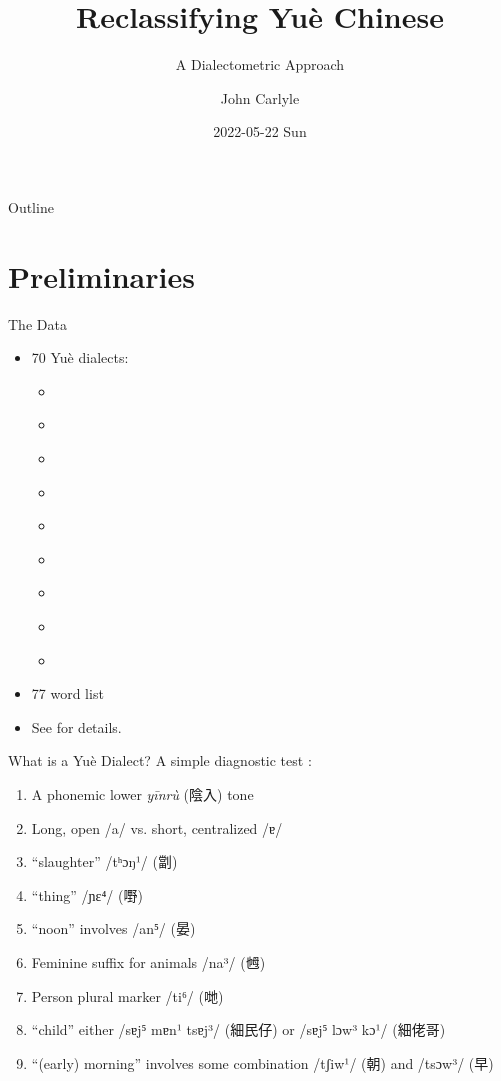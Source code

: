 \documentclass[presentation]{beamer}
\author{John Carlyle}
\date{2022-05-22 Sun}
\title{Reclassifying Yuè Chinese}
\subtitle{A Dialectometric Approach}
\institute[INST]{University of Washington\\\url{jtcarlyl@uw.edu}}
\begin{document}
\maketitle
\begin{frame}{Outline}
\tableofcontents
\end{frame}


\section{Preliminaries}
\label{sec:orgf3ca913}
\begin{frame}[label={sec:org22c3fef}]{The Data}
\begin{itemize}
\item 70 Yuè dialects:
\begin{itemize}
\item \textcite{zhanPDci}
\item \textcite{zhanPDzi}
\item \textcite{zhanYB}
\item \textcite{zhanYX}
\item \textcite{zhangaiyao}
\item \textcite{yue2005}
\item \textcite{xieGuangxi}
\item \textcite{liWuHua}
\item \textcite{yangjiang}
\end{itemize}
\item 77 word list
\item See \textcite{carlyle2020commonyue} for details.
\end{itemize}
\end{frame}
\begin{frame}[label={sec:orgb7b97de}]{What is a Yuè Dialect?}
A simple diagnostic test \autocite[pp. 33-34]{carlyle2020commonyue}:
\begin{enumerate}
\item A phonemic lower \emph{yīnrù} (陰入) tone
\item Long, open /a/ vs. short, centralized /ɐ/
\item ``slaughter'' /tʰɔŋ¹/ (劏)
\item ``thing'' /ɲɛ⁴/ (嘢)
\item ``noon'' involves /an⁵/ (晏)
\item Feminine suffix for animals /na³/ (乸)
\item Person plural marker /ti⁶/ (哋)
\item ``child'' either /sɐj⁵ mɐn¹ tsɐj³/ (細民仔) or /sɐj⁵ lɔw³ kɔ¹/ (細佬哥)
\item ``(early) morning'' involves some combination /tʃiw¹/ (朝) and /tsɔw³/ (早)
\end{enumerate}
\end{frame}
\end{document}
